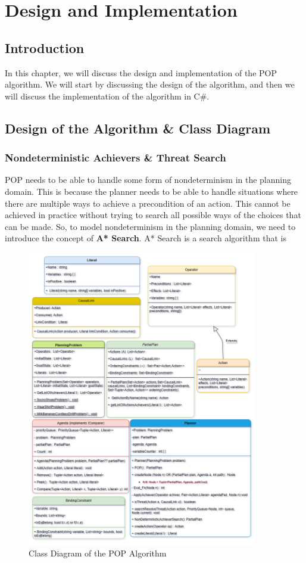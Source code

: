 \chapter{Design and Implementation}
\label{chap:design_and_implementation}


\section{Introduction}
In this chapter, we will discuss the design and implementation of the \ac{POP} algorithm.
We will start by discussing the design of the algorithm,
and then we will discuss the implementation of the algorithm in C\#.

\section{Design of the Algorithm \& Class Diagram}
\subsection{Nondeterministic Achievers \& Threat Search} \label {subsec:nondeterministic_achievers_threat_search}
\acf{POP} needs to be able to handle some form of nondeterminism in the planning domain. This is because the planner needs
to be able to handle situations where there are multiple ways to achieve a precondition
of an action. This cannot be achieved in practice without trying to search all possible ways of the choices that can be made.
So, to model nondeterminism in the planning domain, we need to introduce the concept of \textbf{A* Search}.
A* Search is a search algorithm that is


\begin{figure}[ht]
    \centering
    \includegraphics[width=0.9\textwidth]{images/POP.png}
    \caption[Class Diagram of the POP Algorithm]{Class Diagram of the POP Algorithm}
    \label{fig:pop}
\end{figure}